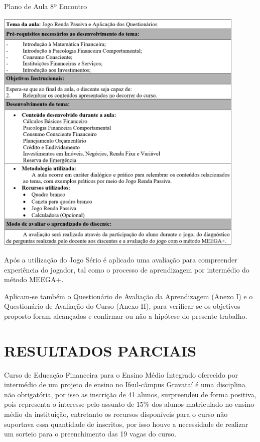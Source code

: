 \graphicspath{{quadros/}} 
\begin{quadro}[!ht]
\centering
\begin{minipage}{1.\textwidth}
\caption{Plano de Aula 8º Encontro}
\centering
\includegraphics[width=0.9\textwidth]{quadro-12_plano-aula-8}
\label{quad: quadro12}
\end{minipage}
\end{quadro}

Após a utilização do Jogo Sério é aplicado uma avaliação para compreender experiência do jogador, tal como o processo de aprendizagem por intermédio do método MEEGA+.

Aplicam-se também o Questionário de Avaliação da Aprendizagem (Anexo I) e o Questionário de Avaliação do Curso (Anexo II), para verificar se os objetivos proposto foram alcançados e confirmar ou não a hipótese do presente trabalho.

\chapter{RESULTADOS PARCIAIS}
Curso de Educação Financeira para o Ensino Médio Integrado oferecido por intermédio de um projeto de ensino no Ifsul-câmpus Gravataí é uma disciplina não obrigatória, por isso as inscrição de 41 alunos, surpreendeu de forma positiva, pois representa o interesse pelo assunto de 15\% dos alunos matriculado no ensino médio da instituição, entretanto os recursos disponíveis para o curso não suportava essa quantidade de inscritos, por isso houve a necessidade de realizar um sorteio para o preenchimento das 19 vagas do curso.

